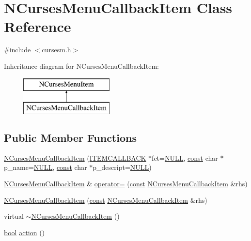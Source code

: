 \hypertarget{class_n_curses_menu_callback_item}{\section{N\-Curses\-Menu\-Callback\-Item Class Reference}
\label{class_n_curses_menu_callback_item}
}


{\ttfamily \#include $<$cursesm.\-h$>$}

Inheritance diagram for N\-Curses\-Menu\-Callback\-Item\-:\begin{figure}[H]
\begin{center}
\leavevmode
\includegraphics[height=2.000000cm]{class_n_curses_menu_callback_item}
\end{center}
\end{figure}
\subsection*{Public Member Functions}
\begin{DoxyCompactItemize}
\item 
\hyperlink{class_n_curses_menu_callback_item_a6f936f6de37fb673cfa19f3358617c08}{N\-Curses\-Menu\-Callback\-Item} (\hyperlink{cursesm_8h_a748967a344eddee14d7e14da3b2d6b85}{I\-T\-E\-M\-C\-A\-L\-L\-B\-A\-C\-K} $\ast$fct=\hyperlink{internal_8h_a070d2ce7b6bb7e5c05602aa8c308d0c4}{N\-U\-L\-L}, \hyperlink{term__entry_8h_a57bd63ce7f9a353488880e3de6692d5a}{const} char $\ast$p\-\_\-name=\hyperlink{internal_8h_a070d2ce7b6bb7e5c05602aa8c308d0c4}{N\-U\-L\-L}, \hyperlink{term__entry_8h_a57bd63ce7f9a353488880e3de6692d5a}{const} char $\ast$p\-\_\-descript=\hyperlink{internal_8h_a070d2ce7b6bb7e5c05602aa8c308d0c4}{N\-U\-L\-L})
\item 
\hyperlink{class_n_curses_menu_callback_item}{N\-Curses\-Menu\-Callback\-Item} \& \hyperlink{class_n_curses_menu_callback_item_a8824781bdbe9ecc737b3f5aea6db47f5}{operator=} (\hyperlink{term__entry_8h_a57bd63ce7f9a353488880e3de6692d5a}{const} \hyperlink{class_n_curses_menu_callback_item}{N\-Curses\-Menu\-Callback\-Item} \&rhs)
\item 
\hyperlink{class_n_curses_menu_callback_item_afcee5559faec8ceaf27ee6660702b107}{N\-Curses\-Menu\-Callback\-Item} (\hyperlink{term__entry_8h_a57bd63ce7f9a353488880e3de6692d5a}{const} \hyperlink{class_n_curses_menu_callback_item}{N\-Curses\-Menu\-Callback\-Item} \&rhs)
\item 
virtual \hyperlink{class_n_curses_menu_callback_item_ab93206c93bdf1b5ada7de0921ecaedb6}{$\sim$\-N\-Curses\-Menu\-Callback\-Item} ()
\item 
\hyperlink{term__entry_8h_a002004ba5d663f149f6c38064926abac}{bool} \hyperlink{class_n_curses_menu_callback_item_a33df49a0748cd49427b547743e735edb}{action} ()
\end{DoxyCompactItemize}
